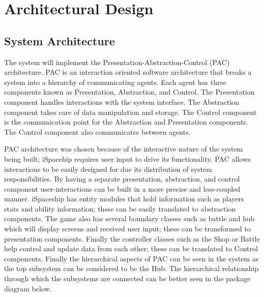 \documentclass[]{article}
\begin{document}

\section{Architectural Design}
\label{sec:architectural_design}

%

\subsection{System Architecture}
\label{sub:system_architecture}

The system will implement the Presentation-Abstraction-Control (PAC) architecture. PAC is an interaction oriented software architecture that breaks a system into a hierarchy of communicating agents. Each agent has three components known as Presentation, Abstraction, and Control. The Presentation component handles interactions with the system interface. The Abstraction component takes care of data manipulation and storage. The Control component is the communication point for the Abstraction and Presentation components. The Control component also communicates between agents. 

PAC architecture was chosen because of the interactive nature of the system being built; iSpacehip requires user input to drive its functionality. PAC allows interactions to be easily designed for due its distribution of system responsibilities. By having a separate presentation, abstraction, and control component user-interactions can be built in a more precise and less-coupled manner. iSpaceship has entity modules that hold information such as players stats and ability information; these can be easily translated to abstraction components. The game also has several boundary classes such as battle and hub which will display screens and received user input; these can be transformed to presentation components. Finally the controller classes such as the Shop or Battle help control and update data from each other; these can be translated to Control components. Finally the hierarchical aspects of PAC can be seen in the system as the top subsystem can be considered to be the Hub. The hierarchical relationship through which the subsystems are connected can be better seen in the package diagram below. 
\end{document}
